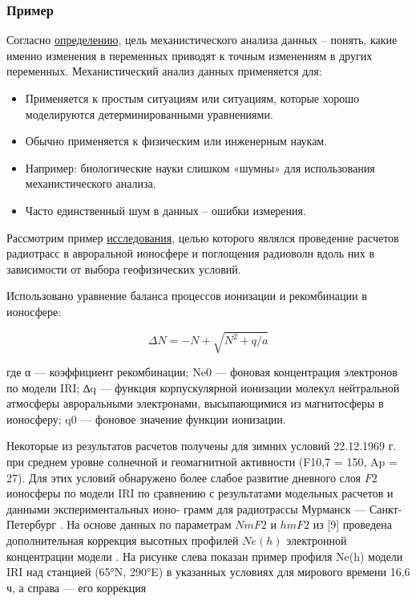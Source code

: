 \documentclass[
]{article}
\providecommand{\tightlist}{%
  \setlength{\itemsep}{0pt}\setlength{\parskip}{0pt}}
\begin{document}
\hypertarget{ux43fux440ux438ux43cux435ux440-1}{%
\subsubsection{Пример}\label{ux43fux440ux438ux43cux435ux440-1}}

Согласно
\href{http://domic.isu.ru/student/entity/5345/content/analysis.pdf}{определению},
цель механистического анализа данных -- понять, какие именно изменения в
переменных приводят к точным изменениям в других переменных.
Механистический анализ данных применяется для:

\begin{itemize}
\tightlist
\item
  Применяется к простым ситуациям или ситуациям, которые хорошо
  моделируются детерминированными уравнениями.
\item
  Обычно применяется к физическим или инженерным наукам.
\item
  Например: биологические науки слишком «шумны» для использования
  механистического анализа.
\item
  Часто единственный шум в данных -- ошибки измерения.
\end{itemize}

Рассмотрим пример
\href{https://cyberleninka.ru/article/n/chislennaya-model-rascheta-radiotrass-korotkih-radiovoln-v-ionosfere}{исследования},
целью которого являлся проведение расчетов радиотрасс в авроральной
ионосфере и поглощения радиоволн вдоль них в зависимости от выбора
геофизических условий.

Использовано уравнение баланса процессов ионизации и рекомбинации в
ионосфере:

\[{\Delta N = -N + \sqrt{N^2+q/a}}\]

где α --- коэффициент рекомбинации; Ne0 --- фоновая концентрация
электронов по модели IRI; ∆q --- функция корпускулярной ионизации
молекул нейтральной атмосферы авроральными электронами, высыпающимися из
магнитосферы в ионосферу; q0 --- фоновое значение функции ионизации.

Некоторые из результатов расчетов получены для зимних условий 22.12.1969
г. при среднем уровне солнечной и геомагнитной активности (F10,7 = 150,
Ap = 27). Для этих условий обнаружено более слабое развитие дневного
слоя \(F2\) ионосферы по модели IRI по сравнению с результатами
модельных расчетов и данными экспериментальных ионо- грамм для
радиотрассы Мурманск --- Санкт-Петербург . На основе данных по
параметрам \(NmF2\) и \(hmF2\) из {[}9{]} проведена дополнительная
коррекция высотных профилей \(Ne(h)\) электронной концентрации модели .
На рисунке слева показан пример профиля Ne(h) модели IRI над станцией
(65°N, 290°E) в указанных условиях для мирового времени 16,6 ч, а справа
--- его коррекция
\end{document}
